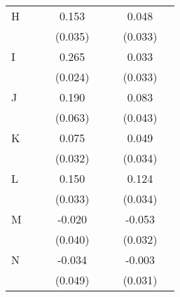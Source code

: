 \begin{longtable}{l*{3}{c}|l*{3}{c}}
		H                   &                     &                     &       0.153\sym{***}&                     &                     &       0.048         \\
		&                     &                     &     (0.035)         &                     &                     &     (0.033)         \\
		I                   &                     &                     &       0.265\sym{***}&                     &                     &       0.033         \\
		&                     &                     &     (0.024)         &                     &                     &     (0.033)         \\
		J                   &                     &                     &       0.190\sym{**} &                     &                     &       0.083         \\
		&                     &                     &     (0.063)         &                     &                     &     (0.043)         \\
		K                   &                     &                     &       0.075\sym{*}  &                     &                     &       0.049         \\
		&                     &                     &     (0.032)         &                     &                     &     (0.034)         \\
		L                   &                     &                     &       0.150\sym{***}&                     &                     &       0.124\sym{***}\\
		&                     &                     &     (0.033)         &                     &                     &     (0.034)         \\
		M                   &                     &                     &      -0.020         &                     &                     &      -0.053         \\
		&                     &                     &     (0.040)         &                     &                     &     (0.032)         \\
		N                   &                     &                     &      -0.034         &                     &                     &      -0.003         \\
		&                     &                     &     (0.049)         &                     &                     &     (0.031)         \\

\end{longtable}
